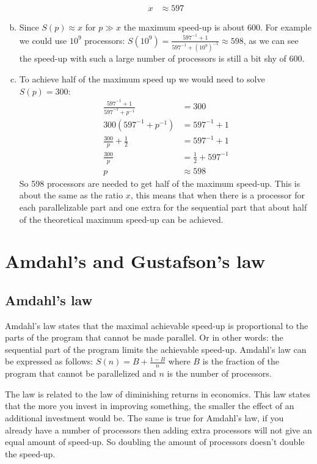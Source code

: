 \documentclass[a4paper]{article}
\begin{document}
\begin{enumerate}[(a)]
\begin{align*}
			x &\approx 597
		\end{align*}
	\item Since $S(p) \approx x$ for $p \gg x$ the maximum speed-up is about 600. For example we could use $10^9$ processors: $\displaystyle S(10^9) = \frac{597^{-1} + 1}{597^{-1} + (10^9)^{-1}} \approx 598$, as we can see the speed-up with such a large number of processors is still a bit shy of 600.
	\item To achieve half of the maximum speed up we would need to solve $S(p) = 300$:
		\begin{align*}
			\frac{597^{-1} + 1}{597^{-1} + p^{-1}} &= 300 \\
			300 (597^{-1} + p^{-1}) &= 597^{-1} + 1 \\
			\frac{300}{p} + \frac{1}{2} &= 597^{-1} + 1 \\
			\frac{300}{p} &= \frac{1}{2} + 597^{-1} \\
			p &\approx 598
		\end{align*}
		So 598 processors are needed to get half of the maximum speed-up. This is about the same as the ratio $x$, this means that when there is a processor for each parallelizable part and one extra for the sequential part that about half of the theoretical maximum speed-up can be achieved.
\end{enumerate}

\section{Amdahl's and Gustafson's law}
\subsection{Amdahl's law}
Amdahl's law states that the maximal achievable speed-up is proportional to the parts of the program that cannot be made parallel. Or in other words: the sequential part of the program limits the achievable speed-up. Amdahl's law can be expressed as follows: $S(n) = B + \frac{1 - B}{n}$ where $B$ is the fraction of the program that cannot be parallelized and $n$ is the number of processors.

The law is related to the law of diminishing returns in economics. This law states that the more you invest in improving something, the smaller the effect of an additional investment would be. The same is true for Amdahl's law, if you already have a number of processors then adding extra processors will not give an equal amount of speed-up. So doubling the amount of processors doesn't double the speed-up.
\end{document}
